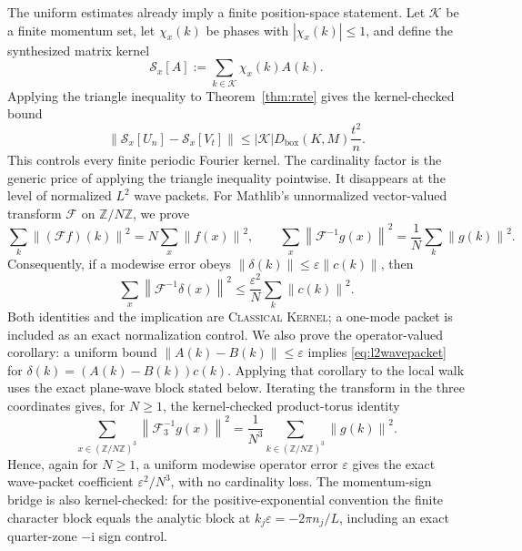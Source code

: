 \documentclass[11pt]{article}
\newcommand{\Kernel}{\textcolor{kernelcolor}{\textsc{Kernel}}}
\newcommand{\Classical}{\textcolor{classicalcolor}{\textsc{Classical}}}
\newcommand{\ii}{\mathrm{i}}
\newcommand{\norm}[1]{\left\lVert #1\right\rVert}
\begin{document}
The uniform estimates already imply a finite position-space statement.  Let
$\mathcal K$ be a finite momentum set, let $\chi_x(k)$ be phases with
$|\chi_x(k)|\leq1$, and define the synthesized matrix kernel
\[
 \mathcal S_x[A]:=\sum_{k\in\mathcal K}\chi_x(k)A(k).
\]
Applying the triangle inequality to Theorem~\ref{thm:rate} gives the
kernel-checked bound
\begin{equation}\label{eq:finitefourier}
 \norm{\mathcal S_x[U_n]-\mathcal S_x[V_t]}
 \leq |\mathcal K|D_{\mathrm{box}}(K,M)\frac{t^2}{n}.
\end{equation}
This controls every finite periodic Fourier kernel.  The cardinality factor is
the generic price of applying the triangle inequality pointwise.  It disappears
at the level of normalized $L^2$ wave packets.  For Mathlib's unnormalized
vector-valued transform $\mathcal F$ on $\mathbb Z/N\mathbb Z$, we prove
\begin{equation}\label{eq:plancherel}
 \sum_k
   \norm{(\mathcal F f)(k)}^2
   =N\sum_x
   \norm{f(x)}^2,
 \qquad
 \sum_x
   \norm{\mathcal F^{-1}g(x)}^2
   =\frac1N\sum_k
   \norm{g(k)}^2.
\end{equation}
Consequently, if a modewise error obeys
$\norm{\delta(k)}\leq\varepsilon\norm{c(k)}$, then
\begin{equation}\label{eq:l2wavepacket}
 \sum_x\norm{\mathcal F^{-1}\delta(x)}^2
 \leq \frac{\varepsilon^2}{N}
       \sum_k\norm{c(k)}^2.
\end{equation}
Both identities and the implication are \Classical{} \Kernel{}; a one-mode
packet is included as an exact normalization control.  We also prove the
operator-valued corollary: a uniform bound
$\norm{A(k)-B(k)}\leq\varepsilon$ implies
\eqref{eq:l2wavepacket} for
  $\delta(k)=(A(k)-B(k))c(k)$.  Applying that corollary to the local walk
  uses the exact plane-wave block stated below.  Iterating the transform in
  the three coordinates gives, for $N\geq1$, the kernel-checked product-torus identity
  \begin{equation}\label{eq:plancherel3}
    \sum_{x\in(\mathbb Z/N\mathbb Z)^3}
      \norm{\mathcal F_3^{-1}g(x)}^2
    =\frac{1}{N^3}
      \sum_{k\in(\mathbb Z/N\mathbb Z)^3}\norm{g(k)}^2.
  \end{equation}
  Hence, again for $N\geq1$, a uniform modewise operator error $\varepsilon$ gives the exact
  wave-packet coefficient $\varepsilon^2/N^3$, with no cardinality loss.  The
  momentum-sign bridge is also kernel-checked: for the positive-exponential
  convention the finite character block equals the analytic block at
  $k_j\varepsilon=-2\pi n_j/L$, including an exact quarter-zone $-\ii$ sign
  control.
\end{document}
